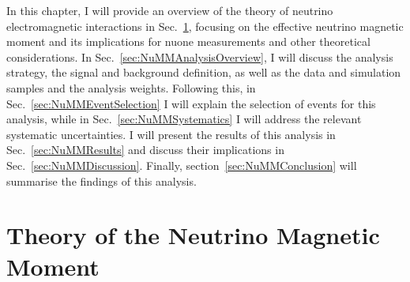 



In this chapter, I will provide an overview of the theory of neutrino electromagnetic interactions in Sec.~\ref{sec:NuMMTheory}, focusing on the effective neutrino magnetic moment and its implications for \gls{nuone} measurements and other theoretical considerations. In Sec.~\ref{sec:NuMMAnalysisOverview}, I will discuss the analysis strategy, the signal and background definition, as well as the data and simulation samples and the analysis weights. Following this, in Sec.~\ref{sec:NuMMEventSelection} I will explain the selection of events for this analysis, while in Sec.~\ref{sec:NuMMSystematics} I will address the relevant systematic uncertainties. I will present the results of this analysis in Sec.~\ref{sec:NuMMResults} and discuss their implications in Sec.~\ref{sec:NuMMDiscussion}. Finally, section~\ref{sec:NuMMConclusion} will summarise the findings of this analysis.

\section{Theory of the Neutrino Magnetic Moment}\label{sec:NuMMTheory}

